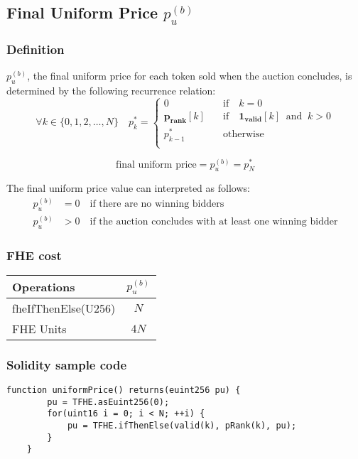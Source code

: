 
\subsection{Final Uniform Price $p_{u}^{(b)}$}

\subsubsection{Definition}
$p_{u}^{(b)}$, the final uniform price for each token sold when the auction concludes, is determined by the following recurrence relation:
\begin{equation*}
    \forall k \in \{0,1,2, \dots, N\} \quad p_{k}^{*} = 
    \begin{cases}
        0 &\text{if} \quad k = 0
        \\
        \mathbf{p_{rank}}[k] \quad &\text{if} \quad \mathbf{1_{valid}}[k] \ \text{ and } \ k > 0
        \\
        p_{k-1}^{*} \quad &\text{otherwise} \\
    \end{cases}
\end{equation*}

\begin{equation*}
    \text{final uniform price} = p_{u}^{(b)} = p_{N}^{*}
\end{equation*}

The final uniform price value can interpreted as follows:
\begin{equation*}
    \begin{split}
        p_{u}^{(b)} &= 0 \quad \text{if there are no winning bidders}
        \\
        p_{u}^{(b)} &> 0 \quad \text{if the auction concludes with at least one winning bidder}
    \end{split}
\end{equation*}

\subsubsection{FHE cost}

\renewcommand{\arraystretch}{1.5}
\begin{tabular}{ |l|c| }
    \hline    
    Operations & $p_{u}^{(b)}$ \\ 
    \hline
    fheIfThenElse(U256)  & $N$ \\
    \hline
    \hline
    FHE Units            & $4N$ \\
    \hline
\end{tabular}

\subsubsection{Solidity sample code}

\begin{lstlisting}[language=Solidity]
    function uniformPrice() returns(euint256 pu) {
        pu = TFHE.asEuint256(0);
        for(uint16 i = 0; i < N; ++i) {
            pu = TFHE.ifThenElse(valid(k), pRank(k), pu);
        }
    }    
\end{lstlisting}

